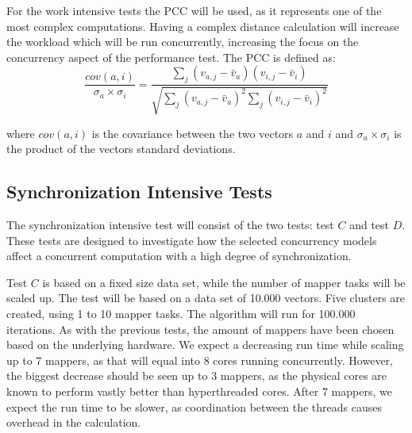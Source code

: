 For the work intensive tests the \ac{PCC} will be used, as it represents one of the most complex computations. Having a complex distance calculation will increase the workload which will be run concurrently, increasing the focus on the concurrency aspect of the performance test. The \ac{PCC} is defined as\cite[p. 4]{breese1998empirical}:
\begin{equation}\label{pearsonverbose}
\frac{cov(a,i)}{\sigma_a \times \sigma_i} = \frac{\sum_j(v_{a,j}-\bar{v}_a)(v_{i,j}-\bar{v}_i)}{\sqrt{{\sum_j}(v_{a,j}-\bar{v}_a)^2 \sum_j(v_{i,j}-\bar{v}_i)^2}}
\end{equation}

where $cov(a,i)$ is the covariance between the two vectors $a$ and $i$ and $\sigma_a \times \sigma_i$ is the product of the vectors standard deviations.

\subsection{Synchronization Intensive Tests}
The synchronization intensive test will consist of the two tests: test $C$ and test $D$. These tests are designed to investigate how the selected concurrency models affect a concurrent computation with a high degree of synchronization. 

Test $C$ is based on a fixed size data set, while the number of mapper tasks will be scaled up.  The test will be based on a data set of 10.000 vectors. Five clusters are created, using 1 to 10 mapper tasks. The algorithm will run for 100.000 iterations. As with the previous tests, the amount of mappers have been chosen based on the underlying hardware. We expect a decreasing run time while scaling up to 7 mappers, as that will equal into 8 cores running concurrently. However, the biggest decrease should be seen up to 3 mappers, as the physical cores are known to perform vastly better than hyperthreaded cores. After 7 mappers, we expect the run time to be slower, as coordination between the threads causes overhead in the calculation.


